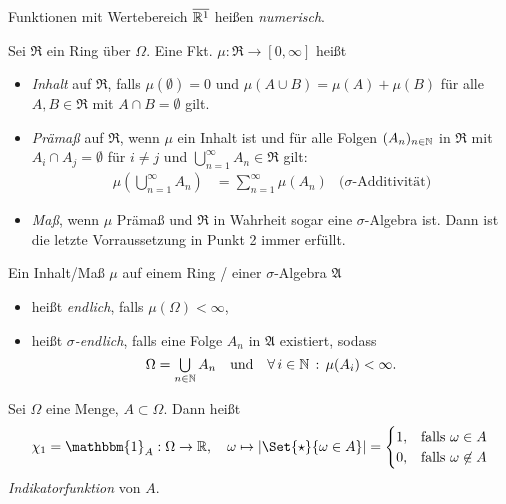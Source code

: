 \documentclass{cheat-sheet}
\newcommand{\Alg}{\mathfrak{A}} %
\newcommand{\Ring}{\mathfrak{R}} %
\newcommand{\ind}{\mathbbm{1}} %
\renewcommand{\ER}{\overline{\R^1}} %
\begin{document}
\begin{defn}
  Funktionen mit Wertebereich $\ER$ heißen \emph{numerisch}.
\end{defn}

\begin{defn}
  Sei $\Ring$ ein Ring über $\Omega$. Eine Fkt. $\mu : \Ring \to \left[ 0, \infty \right]$ heißt
  \begin{itemize}
    \item \emph{Inhalt} auf $\Ring$, falls $\mu(\emptyset) = 0$ und $\mu(A \cup B) = \mu(A) + \mu(B)$ für alle $A, B \in \Ring$ mit $A \cap B = \emptyset$ gilt.
    \item \emph{Prämaß} auf $\Ring$, wenn $\mu$ ein Inhalt ist und für alle Folgen $(A_n)_{n \in \mathbb{N}}$ in $\Ring$ mit $A_i \cap A_j = \emptyset$ für $i \not= j$ und $\bigcup_{n=1}^\infty A_n \in \Ring$ gilt:
    \begin{align*}
      \mu \left( \bigcup_{n=1}^\infty A_n \right) &= \sum_{n=1}^\infty \mu(A_n) & \text{($\sigma$-Additivität)}
    \end{align*}
    \item \emph{Maß}, wenn $\mu$ Prämaß und $\Ring$ in Wahrheit sogar eine $\sigma$-Algebra ist. Dann ist die letzte Vorraussetzung in Punkt 2 immer erfüllt.
  \end{itemize}
\end{defn}

\begin{defn}
  Ein Inhalt/Maß $\mu$ auf einem Ring / einer $\sigma$-Algebra $\Alg$
  \begin{itemize}
    \item heißt \emph{endlich}, falls $\mu(\Omega) < \infty$,
    \item heißt \emph{$\sigma$-endlich}, falls eine Folge $A_n$ in $\Alg$ existiert, sodass
    \[ \Omega = \bigcup_{n \in \N} A_n \quad \text{und} \quad \fa{i \in \N} \mu(A_i) < \infty. \]
  \end{itemize}
\end{defn}

\begin{nota}
  Sei $\Omega$ eine Menge, $A \subset \Omega$. Dann heißt
  \[ \chi_1 = \ind_A : \Omega \to \R, \quad \omega \mapsto \abs{\Set{ \star }{ \omega \in A }} =
  \begin{cases}
    1, & \text{falls } \omega \in A \\
    0, & \text{falls } \omega \not\in A
  \end{cases} \]
  \emph{Indikatorfunktion} von $A$.
\end{nota}
\end{document}
